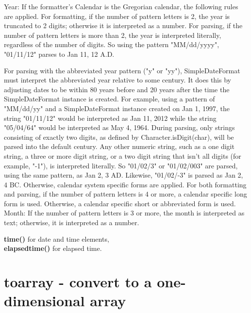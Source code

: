         Year: If the formatter's Calendar is the Gregorian calendar, the
        following rules are applied. For formatting, if the number of pattern
        letters is 2, the year is truncated to 2 digits; otherwise it is
        interpreted as a number. For parsing, if the number of pattern letters
        is more than 2, the year is interpreted literally, regardless of the
        number of digits. So using the pattern "MM/dd/yyyy", "01/11/12" parses
        to Jan 11, 12 A.D.

        For parsing with the abbreviated year pattern ("y" or "yy"),
        SimpleDateFormat must interpret the abbreviated year relative to some
        century. It does this by adjusting dates to be within 80 years before
        and 20 years after the time the SimpleDateFormat instance is created.
        For example, using a pattern of "MM/dd/yy" and a SimpleDateFormat
        instance created on Jan 1, 1997, the string "01/11/12" would be
        interpreted as Jan 11, 2012 while the string "05/04/64" would be
        interpreted as May 4, 1964. During parsing, only strings consisting of
        exactly two digits, as defined by Character.isDigit(char), will be
        parsed into the default century. Any other numeric string, such as a one
        digit string, a three or more digit string, or a two digit string that
        isn't all digits (for example, "-1"), is interpreted literally. So
        "01/02/3" or "01/02/003" are parsed, using the same pattern, as Jan 2, 3
        AD. Likewise, "01/02/-3" is parsed as Jan 2, 4 BC. Otherwise, calendar
        system specific forms are applied. For both formatting and parsing, if
        the number of pattern letters is 4 or more, a calendar specific long
        form is used. Otherwise, a calendar specific short or abbreviated form
        is used. Month: If the number of pattern letters is 3 or more, the month
        is interpreted as text; otherwise, it is interpreted as a number.

        
         {\bf time()} for date and time elements, \\
         {\bf elapsedtime()} for elapsed time.
        


    \section{toarray - convert to a one-dimensional array}\label{sec:iftoarray}
            
